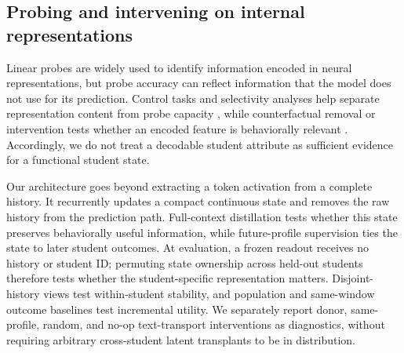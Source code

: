 \subsection{Probing and intervening on internal representations}

Linear probes are widely used to identify information encoded in neural
representations, but probe accuracy can reflect information that the model does
not use for its prediction.  Control tasks and selectivity analyses help
separate representation content from probe capacity \citep{hewitt2019designing},
while counterfactual removal or intervention tests whether an encoded feature is
behaviorally relevant \citep{elazar2021amnesic,ravfogel2021counterfactual}.
Accordingly, we do not treat a decodable student attribute as sufficient
evidence for a functional student state.

Our architecture goes beyond extracting a token activation from a complete
history.  It recurrently updates a compact continuous state and removes the raw
history from the prediction path.  Full-context distillation tests whether this
state preserves behaviorally useful information, while future-profile
supervision ties the state to later student outcomes.  At evaluation, a frozen
readout receives no history or student ID; permuting state ownership across
held-out students therefore tests whether the student-specific representation
matters.  Disjoint-history views test within-student stability, and population
and same-window outcome baselines test incremental utility.  We separately
report donor, same-profile, random, and no-op text-transport interventions as
diagnostics, without requiring arbitrary cross-student latent transplants to be
in distribution.
